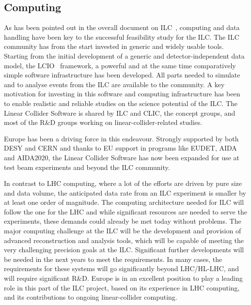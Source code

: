 \documentclass[%
 reprint,
 floatfix,
 amsmath,amssymb,
 aps,
]{revtex4-1}
\begin{document}
\subsection{Computing}
As has been pointed out in the overall document on ILC~\cite{ILCESU1}, computing and data 
handling have been key to the successful feasibility study for the ILC. The ILC community 
has from the start invested in generic and widely usable tools. Starting from 
the initial development of a generic and detector-independent data model, the 
LCIO~\cite{bib:lcio} framework, a powerful and at the same time comparatively simple software 
infrastructure has been developed. All parts needed to simulate and to analyse 
events from the ILC are available to the community. A key motivation for investing
in this software and computing infrastructure has been to enable realistic and reliable 
studies on the science potential of the ILC. The Linear Collider Software is shared by ILC and 
CLIC, the concept groups, and most of the R\&D groups working on linear-collider-related 
studies. 

Europe has been a driving force in this endeavour. Strongly 
supported by both DESY and CERN and thanks to EU support in programs like EUDET, 
AIDA and AIDA2020, the Linear Collider Software has now been expanded for use at test 
beam experiments and beyond the ILC     community.

In contrast to LHC computing, where a lot of the efforts are driven by pure 
size and data volume, the anticipated data rate from an ILC experiment is 
smaller by at least one order of magnitude. The computing architecture needed for 
ILC will follow the one for the LHC and while significant resources are needed 
to serve the experiments, these demands could already be met today without problems. 
The major computing challenge at the ILC will be the development and provision 
of advanced reconstruction and analysis tools, which will be capable of meeting 
the very challenging precision goals at the ILC. Significant further 
developments will be needed in the next years to meet the requirements. 
In many cases, the requirements for these systems will go significantly beyond LHC/HL-LHC, 
and will require significant R\&D. Europe is in an excellent position to play a 
leading role in this part of the ILC project, based on its experience in LHC 
computing, and its contributions to ongoing linear-collider computing. 
\end{document}

